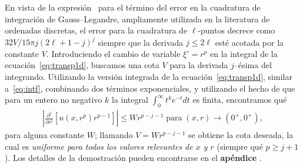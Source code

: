 En vista de la expresión~\cite[p. 77]{Trefethen2008} 
para el término del error en la cuadratura de integración 
de Gauss--Legandre, ampliamente utilizada en la literatura 
de ordenadas discretas, el error para la cuadratura de $\ell$-puntos 
decrece como $32V/15\pi j (2\ell+1-j)^j$ siempre que la derivada 
$j \leq 2\ell$ esté acotada por la constante $V$. 
Introduciendo el cambio de variable  $\xi'=r^p$ en la integral 
de la ecuación~\eqref{eq:transp1d}, buscamos una cota $V$ 
para la derivada $j$--ésima del integrando. 
Utilizando la versión integrada de la ecuación~\eqref{eq:transp1d}, 
similar a~\eqref{eq:intf}, combinando dos términos exponenciales, 
y utilizando el hecho de que para un entero no negativo $k$ 
la integral $\int_0^\infty t^k e^{-t} dt$ es finita, 
encontramos qué
\begin{equation*}
\begin{split}
\left | \frac{\partial^j }{\partial r^j}\left[ u(x,r^p) r^{p-1}\right]
\right|\leq W r^{p-j-1}\; \text{para}  \; (x,r) \to (0^+,0^+),
\end{split}
\label{eq:boundedder}
\end{equation*}
para alguna constante $W$; llamando $V = W r^{p-j-1}$  
se obtiene la cota deseada, la cual es {\em uniforme 
para todos los valores relevantes de $x$ y $r$ } (siempre qué 
$p \ge j+1$). Los 
detalles de la demostración pueden encontrarse en el {\bf apéndice }.

